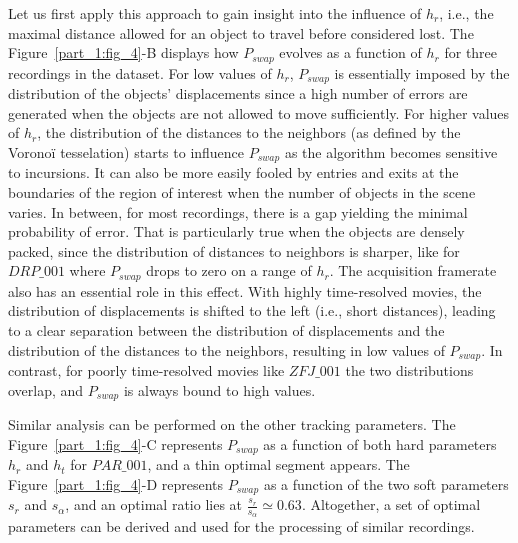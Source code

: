     Let us first apply this approach to gain insight into the influence of $h_r$, i.e., the maximal distance allowed for an object to travel before considered lost. The Figure~\ref{part_1:fig_4}-B displays how $P_{swap}$ evolves as a function of $h_r$ for three recordings in the dataset. For low values of $h_r$, $P_{swap}$ is essentially imposed by the distribution of the objects' displacements since a high number of errors are generated when the objects are not allowed to move sufficiently. For higher values of $h_r$, the distribution of the distances to the neighbors (as defined by the Voronoï tesselation) starts to influence $P_{swap}$ as the algorithm becomes sensitive to incursions. It can also be more easily fooled by entries and exits at the boundaries of the region of interest when the number of objects in the scene varies.
    In between, for most recordings, there is a gap yielding the minimal probability of error. That is particularly true when the objects are densely packed, since the distribution of distances to neighbors is sharper, like for $DRP\_001$ where $P_{swap}$ drops to zero on a range of $h_r$. The acquisition framerate also has an essential role in this effect. With highly time-resolved movies, the distribution of displacements is shifted to the left (i.e., short distances), leading to a clear separation between the distribution of displacements and the distribution of the distances to the neighbors, resulting in low values of $P_{swap}$. In contrast, for poorly time-resolved movies like $ZFJ\_001$ the two distributions overlap, and $P_{swap}$ is always bound to high values.

    Similar analysis can be performed on the other tracking parameters. The Figure~\ref{part_1:fig_4}-C represents $P_{swap}$ as a function of both hard parameters $h_r$ and $h_t$ for $PAR\_001$, and a thin optimal segment appears. The Figure~\ref{part_1:fig_4}-D represents $P_{swap}$ as a function of the two soft parameters $s_r$ and $s_\alpha$, and an optimal ratio lies at $\frac{s_r}{s_\alpha} \simeq 0.63$. Altogether, a set of optimal parameters can be derived and used for the processing of similar recordings.

